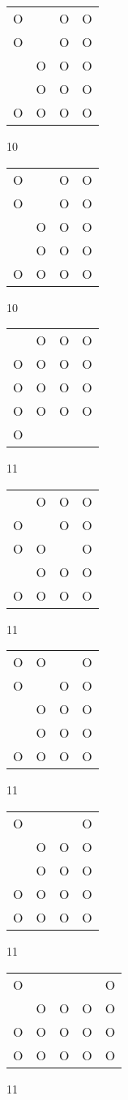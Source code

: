 \begin{tabular}{|m{0.2cm}m{0.2cm}m{0.2cm}m{0.2cm}|}\hline
O& &O&O\\
O& &O&O\\
 &O&O&O\\
 &O&O&O\\
O&O&O&O\\
\hline\end{tabular}10
\begin{tabular}{|m{0.2cm}m{0.2cm}m{0.2cm}m{0.2cm}|}\hline
O& &O&O\\
O& &O&O\\
 &O&O&O\\
 &O&O&O\\
O&O&O&O\\
\hline\end{tabular}10
\begin{tabular}{|m{0.2cm}m{0.2cm}m{0.2cm}m{0.2cm}|}\hline
 &O&O&O\\
O&O&O&O\\
O&O&O&O\\
O&O&O&O\\
O& & & \\
\hline\end{tabular}11
\begin{tabular}{|m{0.2cm}m{0.2cm}m{0.2cm}m{0.2cm}|}\hline
 &O&O&O\\
O& &O&O\\
O&O& &O\\
 &O&O&O\\
O&O&O&O\\
\hline\end{tabular}11
\begin{tabular}{|m{0.2cm}m{0.2cm}m{0.2cm}m{0.2cm}|}\hline
O&O& &O\\
O& &O&O\\
 &O&O&O\\
 &O&O&O\\
O&O&O&O\\
\hline\end{tabular}11
\begin{tabular}{|m{0.2cm}m{0.2cm}m{0.2cm}m{0.2cm}|}\hline
O& & &O\\
 &O&O&O\\
 &O&O&O\\
O&O&O&O\\
O&O&O&O\\
\hline\end{tabular}11
\begin{tabular}{|m{0.2cm}m{0.2cm}m{0.2cm}m{0.2cm}m{0.2cm}|}\hline
O& & & &O\\
 &O&O&O&O\\
O&O&O&O&O\\
O&O&O&O&O\\
\hline\end{tabular}11
